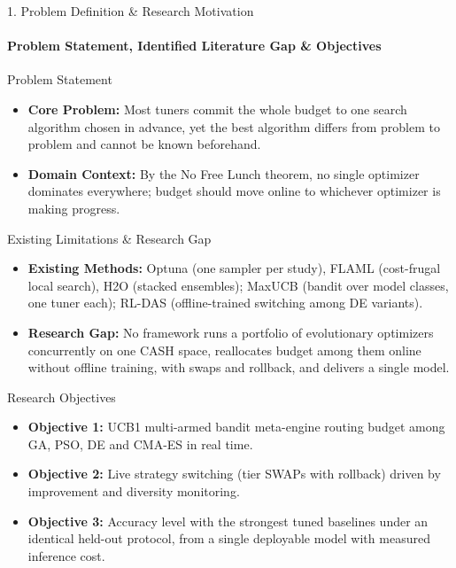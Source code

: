 \documentclass[aspectratio=169, 11pt]{beamer}
\begin{document}
\begin{frame}{1. Problem Definition \& Research Motivation}
    \framesubtitle{Problem Statement, Identified Literature Gap \& Objectives}

    \begin{block}{Problem Statement}
        \scriptsize
        \begin{itemize}
            \setlength{\itemsep}{1pt}
            \item \textbf{Core Problem:} Most tuners commit the whole budget to one search algorithm chosen in advance, yet the best algorithm differs from problem to problem and cannot be known beforehand.
            \item \textbf{Domain Context:} By the No Free Lunch theorem, no single optimizer dominates everywhere; budget should move online to whichever optimizer is making progress.
        \end{itemize}
    \end{block}

    \begin{block}{Existing Limitations \& Research Gap}
        \scriptsize
        \begin{itemize}
            \setlength{\itemsep}{1pt}
            \item \textbf{Existing Methods:} Optuna (one sampler per study), FLAML (cost-frugal local search), H2O (stacked ensembles); MaxUCB \cite{balef2025cash} (bandit over model classes, one tuner each); RL-DAS \cite{guo2024deep} (offline-trained switching among DE variants).
            \item \textbf{Research Gap:} No framework runs a portfolio of evolutionary optimizers concurrently on one CASH space, reallocates budget among them online without offline training, with swaps and rollback, and delivers a single model.
        \end{itemize}
    \end{block}

    \begin{block}{Research Objectives}
        \scriptsize
        \begin{itemize}
            \setlength{\itemsep}{1pt}
            \item \textbf{Objective 1:} UCB1 multi-armed bandit meta-engine routing budget among GA, PSO, DE and CMA-ES in real time.
            \item \textbf{Objective 2:} Live strategy switching (tier SWAPs with rollback) driven by improvement and diversity monitoring.
            \item \textbf{Objective 3:} Accuracy level with the strongest tuned baselines under an identical held-out protocol, from a single deployable model with measured inference cost.
        \end{itemize}
    \end{block}
\end{frame}
\end{document}
